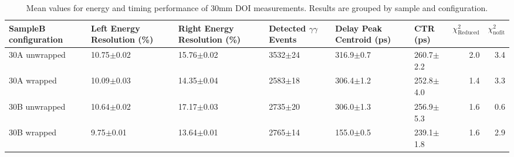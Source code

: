 \begin{table}
\caption{\label{tab:doictrresults} Mean values for energy and timing performance of 30mm DOI measurements. Results are grouped by sample and configuration.}
\begin{tabular}{llllllrr}
\hline
SampleB configuration & Left Energy Resolution (\%) & Right Energy Resolution (\%) & Detected $\gamma\gamma$ Events & Delay Peak Centroid (ps)  & CTR (ps) &  $\chi^2_\text{Reduced}$ &  $\chi^2_\text{nofit}$ \\
\hline
30A     unwrapped     &  10.75$\pm$0.02 &  15.76$\pm$0.02 &  3532$\pm$24 &  316.9$\pm$0.7 &  260.7$\pm$2.2 &        2.0 &    3.4 \\
30A     wrapped       &  10.09$\pm$0.03 &  14.35$\pm$0.04 &  2583$\pm$18 &  306.4$\pm$1.2 &  252.8$\pm$4.0 &        1.4 &    3.3 \\
30B     unwrapped     &  10.64$\pm$0.02 &  17.17$\pm$0.03 &  2735$\pm$20 &  306.0$\pm$1.3 &  256.9$\pm$5.3 &        1.6 &    0.6 \\
30B     wrapped       &   9.75$\pm$0.01 &  13.64$\pm$0.01 &  2765$\pm$14 &  155.0$\pm$0.5 &  239.1$\pm$1.8 &        1.6 &    2.9 \\
\hline
\end{tabular}
\end{table}

